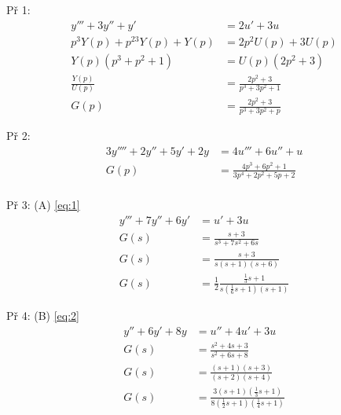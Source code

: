 

Př 1:
\begin{align}
y'''+3y''+y' & = 2u'+3u \\
p^3Y(p)+ p^23Y(p)+ Y(p) & = 2p^2U(p)+3U(p) \\
Y(p)(p^3+p^2+1) & = U(p)(2p^2+3) \\
\frac{Y(p)}{U(p)} & = \frac{2p^2+3}{p^3+3p^2+1} \\
G(p) & = \frac{2p^2 + 3} { p^3 + 3p^2 + p}
\end{align}

Př 2:
\begin{align}
3y''''+2y''+5y'+2y & = 4 u'''+6u''+u \\
G(p) & = \frac{4p^3+6p^2+1}{3p^4+2p^2+5p+2} \\
\end{align}

Př 3: (A) \ref{eq:1}
\begin{equation} \label{eq:1}
\begin{aligned}
y'''+7y''+6y' & = u'+3u \\
G(s) & = \frac{s+3}{s^3+7s^2+6s} \\
G(s) & = \frac{s+3}{s(s+1)(s+6)} \\
G(s) & = \frac12 \frac{\frac13 s + 1}{s (\frac16 s + 1) (s + 1)}
\end{aligned}
\end{equation}

Př 4: (B) \ref{eq:2}
\begin{align} \label{eq:2}
y'' + 6y'+8y &= u''+4u'+3u \\
G(s) & = \frac{s^2 + 4s + 3}{s^2+6s+8} \\
G(s) & = \frac{(s+1)(s+3)}{(s+2)(s+4)} \\
G(s) & = \frac{3(s+1)(\frac13 s + 1)}{8(\frac12 s+1)(\frac14 s+1)}
\end{align}
